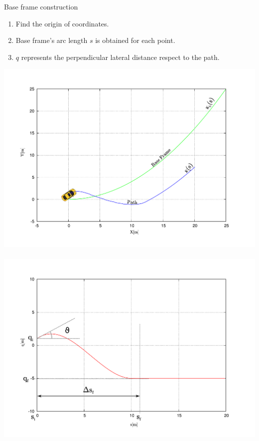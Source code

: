 \begin{frame}{Base frame construction}
  \begin{enumerate}
    \item Find the origin of coordinates.
    \item Base frame's arc length $s$ is obtained for each point.
    \item $q$ represents the perpendicular lateral distance respect to the path.
   \end{enumerate}
   \begin{center}
    \includegraphics[height=0.5\textheight]{justOneCartesian45}
    ~
    \includegraphics[height=0.5\textheight]{justOneFrenet45}
  \end{center}
  
  \note {

  }
\end{frame}

